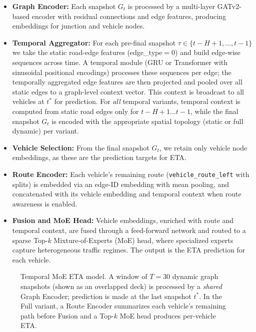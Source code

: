 \begin{itemize}
    \item \textbf{Graph Encoder:} Each snapshot $G_t$ is processed by a multi-layer GATv2-based encoder with residual connections and edge features, producing embeddings for junction and vehicle nodes.
    \item \textbf{Temporal Aggregator:} For each pre-final snapshot $\tau\in\{t{-}H{+}1,\ldots,t{-}1\}$ we take the static road-edge features (edge\_type$=0$) and build edge-wise sequences across time. A temporal module (GRU or Transformer with sinusoidal positional encodings) processes these sequences per edge; the temporally aggregated edge features are then projected and pooled over all static edges to a graph-level context vector. This context is broadcast to all vehicles at $t^*$ for prediction. For \emph{all} temporal variants, temporal context is computed from static road edges only for $t{-}H{+}1\ldots t{-}1$, while the final snapshot $G_t$ is encoded with the appropriate spatial topology (static or full dynamic) per variant.
    \item \textbf{Vehicle Selection:} From the final snapshot $G_t$, we retain only vehicle node embeddings, as these are the prediction targets for ETA.
    \item \textbf{Route Encoder:} Each vehicle’s remaining route (\texttt{vehicle\_route\_left} with splits) is embedded via an edge-ID embedding with mean pooling, and concatenated with its vehicle embedding and temporal context when route awareness is enabled.
    \item \textbf{Fusion and MoE Head:} Vehicle embeddings, enriched with route and temporal context, are fused through a feed-forward network and routed to a sparse Top-$k$ Mixture-of-Experts (MoE) head, where specialized experts capture heterogeneous traffic regimes. The output is the ETA prediction for each vehicle.
\end{itemize}

\begin{figure}[t]
    \centering
    \resizebox{\linewidth}{!}{%
    }
    \caption{Temporal MoE ETA model. A window of $T{=}30$ dynamic graph snapshots (shown as an overlapped deck) is processed by a \emph{shared} Graph Encoder; prediction is made at the last snapshot $t^*$. In the Full variant, a Route Encoder summarizes each vehicle's remaining path before Fusion and a Top-$k$ MoE head produces per-vehicle ETA.}
    \label{fig:temporal-moe-eta}
\end{figure}
